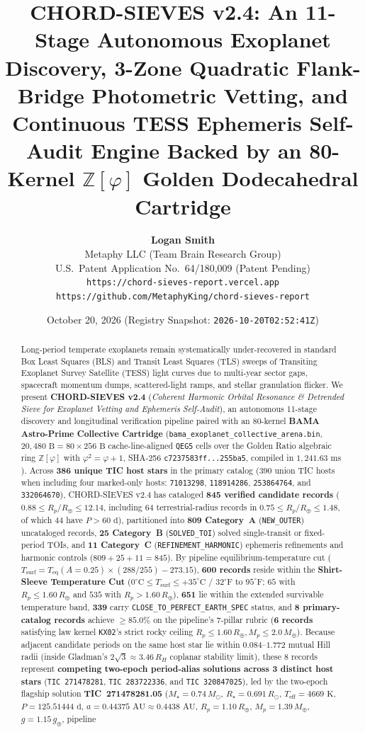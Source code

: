 \documentclass[10pt,twocolumn]{article}
\title{\textbf{CHORD-SIEVES v2.4: An 11-Stage Autonomous Exoplanet Discovery, 3-Zone Quadratic Flank-Bridge Photometric Vetting, and Continuous TESS Ephemeris Self-Audit Engine Backed by an 80-Kernel $\mathbb{Z}[\varphi]$ Golden Dodecahedral Cartridge}}
\author{
  \textbf{Logan Smith}\\
  Metaphy LLC (Team Brain Research Group)\\
  U.S.\ Patent Application No.\ 64/180,009 (Patent Pending)\\
  \texttt{https://chord-sieves-report.vercel.app} \quad \texttt{https://github.com/MetaphyKing/chord-sieves-report}
}
\date{October 20, 2026 (Registry Snapshot: \texttt{2026-10-20T02:52:41Z})}
\begin{document}
\maketitle

\begin{abstract}
Long-period temperate exoplanets remain systematically under-recovered in standard Box Least Squares (BLS) and Transit Least Squares (TLS) sweeps of Transiting Exoplanet Survey Satellite (TESS) light curves due to multi-year sector gaps, spacecraft momentum dumps, scattered-light ramps, and stellar granulation flicker. We present \textbf{CHORD-SIEVES v2.4} (\emph{Coherent Harmonic Orbital Resonance \& Detrended Sieve for Exoplanet Vetting and Ephemeris Self-Audit}), an autonomous 11-stage discovery and longitudinal verification pipeline paired with an 80-kernel \textbf{BAMA Astro-Prime Collective Cartridge} (\texttt{bama\_exoplanet\_collective\_arena.bin}, $20{,}480\text{ B} = 80 \times 256\text{ B}$ cache-line-aligned \texttt{QEG5} cells over the Golden Ratio algebraic ring $\mathbb{Z}[\varphi]$ with $\varphi^2 = \varphi + 1$, SHA-256 \texttt{c7237583ff...255ba5}, compiled in $1{,}241.63\text{ ms}$). Across \textbf{386 unique TIC host stars} in the primary catalog ($390$ union TIC hosts when including four marked-only hosts: \texttt{71013298}, \texttt{118914286}, \texttt{253864764}, and \texttt{332064670}), CHORD-SIEVES v2.4 has cataloged \textbf{845 verified candidate records} ($0.88 \le R_p/R_\oplus \le 12.14$, including $64$ terrestrial-radius records in $0.75 \le R_p/R_\oplus \le 1.48$, of which $44$ have $P > 60\text{ d}$), partitioned into \textbf{809 Category~A} (\texttt{NEW\_OUTER}) uncataloged records, \textbf{25 Category~B} (\texttt{SOLVED\_TOI}) solved single-transit or fixed-period TOIs, and \textbf{11 Category~C} (\texttt{REFINEMENT\_HARMONIC}) ephemeris refinements and harmonic controls ($809 + 25 + 11 = 845$). By pipeline equilibrium-temperature cut ($T_{\text{surf}} = T_{\text{eq}}(A=0.25)\times(288/255) - 273.15$), \textbf{600 records} reside within the \textbf{Shirt-Sleeve Temperature Cut} ($0^\circ\text{C} \le T_{\text{surf}} \le +35^\circ\text{C}$ / $32^\circ\text{F}$ to $95^\circ\text{F}$; $65$ with $R_p \le 1.60\,R_\oplus$ and $535$ with $R_p > 1.60\,R_\oplus$), \textbf{651} lie within the extended survivable temperature band, \textbf{339} carry \texttt{CLOSE\_TO\_PERFECT\_EARTH\_SPEC} status, and \textbf{8 primary-catalog records} achieve $\ge 85.0\%$ on the pipeline's 7-pillar rubric (\textbf{6 records} satisfying law kernel \texttt{KX02}'s strict rocky ceiling $R_p \le 1.60\,R_\oplus, M_p \le 2.0\,M_\oplus$). Because adjacent candidate periods on the same host star lie within $0.084\text{--}1.772$ mutual Hill radii (inside Gladman's $2\sqrt{3} \approx 3.46\,R_H$ coplanar stability limit), these $8$ records represent \textbf{competing two-epoch period-alias solutions across 3 distinct host stars} (\texttt{TIC~271478281}, \texttt{TIC~283722336}, and \texttt{TIC~320847025}), led by the two-epoch flagship solution \textbf{TIC~271478281.05} ($M_\star = 0.74\,M_\odot$, $R_\star = 0.691\,R_\odot$, $T_{\text{eff}} = 4669\text{ K}$, $P = 125.51444\text{ d}$, $a = 0.44375\text{ AU} \approx 0.4438\text{ AU}$, $R_p = 1.10\,R_\oplus$, $M_p = 1.39\,M_\oplus$, $g = 1.15\,g_\oplus$, pipeline 
\end{abstract}
\end{document}
